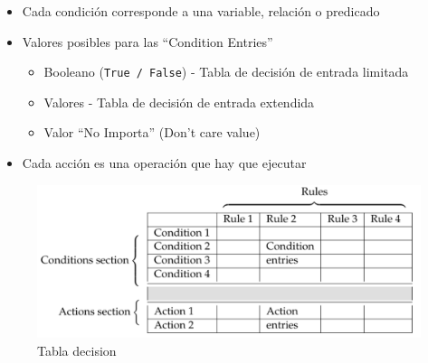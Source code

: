 \begin{paracol}{2}
   \begin{itemize}
   	\item Cada condición corresponde a una variable, relación o predicado
	\item Valores posibles para las ``Condition Entries''
 \begin{itemize}
 	\item Booleano (\lstinline|True / False|) - Tabla de decisión de entrada limitada
	\item Valores - Tabla de decisión de entrada extendida
	\item Valor ``No Importa'' (Don't care value)

 \end{itemize}
\item Cada acción es una operación que hay que ejecutar

   \end{itemize}
\switchcolumn
\begin{figure}[htbp]
   \centering
   \includegraphics[width=0.99\columnwidth]{images/05/tabladecision.png}
   \caption{Tabla decision }
   \label{fig:05/tabladecision}
\end{figure}
\end{paracol}


